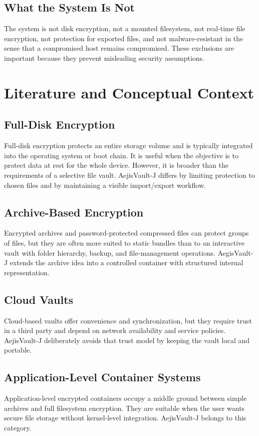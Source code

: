 \documentclass[12pt,a4paper]{report}
\newcommand{\projname}{AejisVault-J}
\begin{document}
\section{What the System Is Not}
The system is not disk encryption, not a mounted filesystem, not real-time file encryption, not protection for exported files, and not malware-resistant in the sense that a compromised host remains compromised. These exclusions are important because they prevent misleading security assumptions.

\chapter{Literature and Conceptual Context}
\section{Full-Disk Encryption}
Full-disk encryption protects an entire storage volume and is typically integrated into the operating system or boot chain. It is useful when the objective is to protect data at rest for the whole device. However, it is broader than the requirements of a selective file vault. \projname{} differs by limiting protection to chosen files and by maintaining a visible import/export workflow.

\section{Archive-Based Encryption}
Encrypted archives and password-protected compressed files can protect groups of files, but they are often more suited to static bundles than to an interactive vault with folder hierarchy, backup, and file-management operations. AegisVault-J extends the archive idea into a controlled container with structured internal representation.

\section{Cloud Vaults}
Cloud-based vaults offer convenience and synchronization, but they require trust in a third party and depend on network availability and service policies. \projname{} deliberately avoids that trust model by keeping the vault local and portable.

\section{Application-Level Container Systems}
Application-level encrypted containers occupy a middle ground between simple archives and full filesystem encryption. They are suitable when the user wants secure file storage without kernel-level integration. \projname{} belongs to this category.
\end{document}
